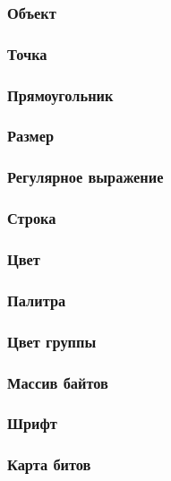 \documentclass[11pt,russian,a4paper]{article}
\begin{document}
\subsubsection{Объект}


\subsubsection{Точка}


\subsubsection{Прямоугольник}


\subsubsection{Размер}


\subsubsection{Регулярное выражение}


\subsubsection{Строка}


\subsubsection{Цвет}


\subsubsection{Палитра}


\subsubsection{Цвет группы}


\subsubsection{Массив байтов}


\subsubsection{Шрифт}


\subsubsection{Карта битов}
\end{document}
